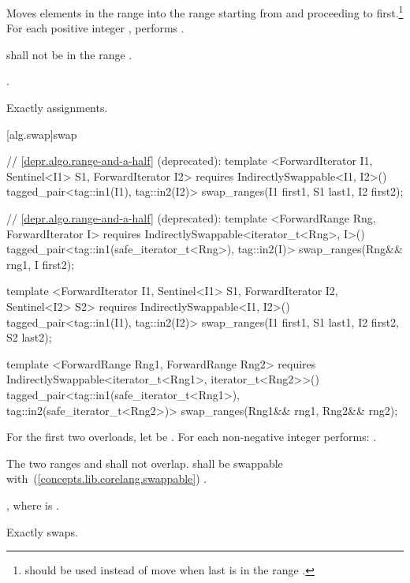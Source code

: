 \begin{itemdescr}
\pnum
\effects
Moves elements in the range 
into the
range 
starting from
and proceeding to first.\footnote{
should be used instead of move when last
is in
the range
.}
For each positive integer
,
performs
.

\pnum
\requires
{}
shall not be in the range
.

\pnum
\returns
{}.

\pnum
\complexity
Exactly
assignments.
\end{itemdescr}

[alg.swap]{swap}

%
\begin{itemdecl}
// \ref{depr.algo.range-and-a-half} (deprecated):
template <ForwardIterator I1, Sentinel<I1> S1, ForwardIterator I2>
  requires IndirectlySwappable<I1, I2>()
  tagged_pair<tag::in1(I1), tag::in2(I2)>
    swap_ranges(I1 first1, S1 last1, I2 first2);

// \ref{depr.algo.range-and-a-half} (deprecated):
template <ForwardRange Rng, ForwardIterator I>
  requires IndirectlySwappable<iterator_t<Rng>, I>()
  tagged_pair<tag::in1(safe_iterator_t<Rng>), tag::in2(I)>
    swap_ranges(Rng&& rng1, I first2);

template <ForwardIterator I1, Sentinel<I1> S1, ForwardIterator I2, Sentinel<I2> S2>
  requires IndirectlySwappable<I1, I2>()
  tagged_pair<tag::in1(I1), tag::in2(I2)>
    swap_ranges(I1 first1, S1 last1, I2 first2, S2 last2);

template <ForwardRange Rng1, ForwardRange Rng2>
  requires IndirectlySwappable<iterator_t<Rng1>, iterator_t<Rng2>>()
  tagged_pair<tag::in1(safe_iterator_t<Rng1>), tag::in2(safe_iterator_t<Rng2>)>
    swap_ranges(Rng1&& rng1, Rng2&& rng2);
\end{itemdecl}

\begin{itemdescr}
\pnum
\effects
For the first two overloads, let  be .
For each non-negative integer 
performs:
.

\pnum
\requires
The two ranges 
and
shall not overlap.
 shall be swappable with~(\ref{concepts.lib.corelang.swappable})
.

\pnum
\returns
{}, where
 is .

\pnum
\complexity
Exactly
swaps.
\end{itemdescr}

